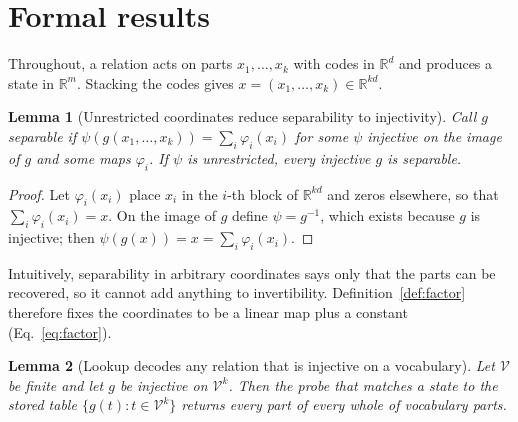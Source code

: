 \documentclass[10pt]{article}
\theoremstyle{plain}
\newtheorem{lemma}{Lemma}
\theoremstyle{remark}
\newcommand{\R}{\mathbb{R}}
\newcommand{\Voc}{\mathcal{V}}
\begin{document}
\FloatBarrier



\clearpage
\appendix
\makeatletter\let\@fb@secFB\relax\makeatother %

\section{Formal results}
\label{app:proofs}

Throughout, a relation acts on parts $x_1, \ldots, x_k$ with codes in $\R^d$ and produces a state in $\R^m$. Stacking the codes gives $x = (x_1, \ldots, x_k) \in \R^{kd}$.



\begin{lemma}[Unrestricted coordinates reduce separability to injectivity]
\label{lem:psi}
Call $g$ separable if $\psi(g(x_1, \ldots, x_k)) = \sum_i \varphi_i(x_i)$ for some $\psi$ injective on the image of $g$ and some maps $\varphi_i$. If $\psi$ is unrestricted, every injective $g$ is separable.
\end{lemma}

\begin{proof}
Let $\varphi_i(x_i)$ place $x_i$ in the $i$-th block of $\R^{kd}$ and zeros elsewhere, so that $\sum_i \varphi_i(x_i) = x$. On the image of $g$ define $\psi = g^{-1}$, which exists because $g$ is injective; then $\psi(g(x)) = x = \sum_i \varphi_i(x_i)$.
\end{proof}

\noindent
Intuitively, separability in arbitrary coordinates says only that the parts can be recovered, so it cannot add anything to invertibility. Definition~\ref{def:factor} therefore fixes the coordinates to be a linear map plus a constant (Eq.~\ref{eq:factor}).

\begin{lemma}[Lookup decodes any relation that is injective on a vocabulary]
\label{lem:lookup}
Let $\Voc$ be finite and let $g$ be injective on $\Voc^k$. Then the probe that matches a state to the stored table $\{g(t) : t \in \Voc^k\}$ returns every part of every whole of vocabulary parts.
\end{lemma}
\end{document}

